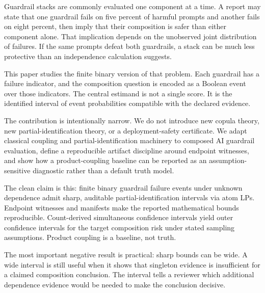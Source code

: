 Guardrail stacks are commonly evaluated one component at a time. A report may
state that one guardrail fails on five percent of harmful prompts and another
fails on eight percent, then imply that their composition is safer than either
component alone. That implication depends on the unobserved joint distribution
of failures. If the same prompts defeat both guardrails, a stack can be much
less protective than an independence calculation suggests.

This paper studies the finite binary version of that problem. Each guardrail has
a failure indicator, and the composition question is encoded as a Boolean event
over those indicators. The central estimand is not a single score. It is the
identified interval of event probabilities compatible with the declared
evidence.

The contribution is intentionally narrow. We do not introduce new copula theory,
new partial-identification theory, or a deployment-safety certificate. We adapt
classical coupling and partial-identification machinery to composed AI
guardrail evaluation, define a reproducible artifact discipline around endpoint
witnesses, and show how a product-coupling baseline can be reported as an
assumption-sensitive diagnostic rather than a default truth model.

The clean claim is this: finite binary guardrail failure events under unknown
dependence admit sharp, auditable partial-identification intervals via atom
LPs. Endpoint witnesses and manifests make the reported mathematical bounds
reproducible. Count-derived simultaneous confidence intervals yield outer
confidence intervals for the target composition risk under stated sampling
assumptions. Product coupling is a baseline, not truth.

The most important negative result is practical: sharp bounds can be wide. A
wide interval is still useful when it shows that singleton evidence is
insufficient for a claimed composition conclusion. The interval tells a reviewer
which additional dependence evidence would be needed to make the conclusion
decisive.
